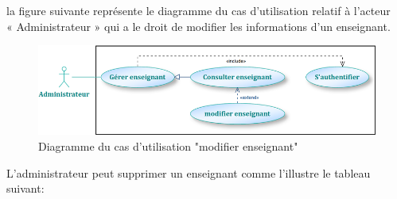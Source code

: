 \documentclass[12 pt]{report}
\begin{document}
la figure suivante représente le diagramme du cas d’utilisation  relatif à l’acteur \\« Administrateur » qui a le droit de modifier les informations d'un enseignant.
\begin{figure}[h]
 \begin{center}
\includegraphics[width=13 cm ,height= 3.8 cm]{a6.PNG}
\caption{Diagramme du cas d’utilisation "modifier enseignant"}
\end{center}
\end{figure}
\newpage
L'administrateur peut supprimer un enseignant comme l’illustre le tableau suivant:
\end{document}
